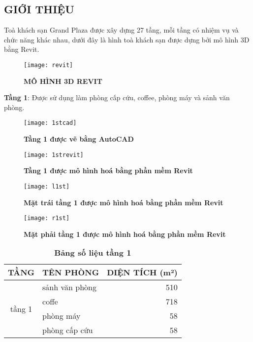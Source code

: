 \subsection{GIỚI THIỆU}
Toà khách sạn Grand Plaza được xây dựng 27 tầng, mỗi tầng có nhiệm vụ và chức năng khác nhau, dưới đây là hình toà khách sạn được dựng bởi mô hình 3D bằng Revit.

\begin{figure}[H]
	\centering
	\texttt{[image: revit]}
	\caption{\textbf{MÔ HÌNH 3D REVIT}}
	\label{revit}
\end{figure}

\newpage
\textbf{Tầng 1}: Được sử dụng làm phòng cấp cứu, coffee, phòng máy và sảnh văn phòng.

\begin{figure}[H]
	\centering
	\texttt{[image: 1stcad]}
    \caption{\textbf{Tầng 1 được vẽ bằng AutoCAD}}
	\label{1stcad}
\end{figure}

\begin{figure}[H]
	\centering
	\texttt{[image: 1strevit]}
	\caption{\textbf{Tầng 1 được mô hình hoá bằng phần mềm Revit}}
	\label{1strevit}
\end{figure}

\begin{figure}[H]
	\centering
	\texttt{[image: l1st]}
	\caption{\textbf{Mặt trái tầng 1 được mô hình hoá bằng phần mềm Revit}}
	\label{l1st}
\end{figure}

\begin{figure}[H]
	\centering
	\texttt{[image: r1st]}
	\caption{\textbf{Mặt phải tầng 1 được mô hình hoá bằng phần mềm Revit}}
	\label{r1st}
\end{figure}

\begin{table}[H]
	\centering
	\caption{\textbf{Bảng số liệu tầng 1}}
\begin{tabular}{|c|l|r|}
	\hline
	TẦNG & TÊN PHÒNG & \multicolumn{1}{l|}{DIỆN TÍCH (m²) } \bigstrut\\
	\hline
	\multirow{4}[8]{*}{tầng 1} & sảnh văn phòng & 510 \bigstrut\\
	\cline{2-3}      & coffe & 718 \bigstrut\\
	\cline{2-3}      & phòng máy & 58 \bigstrut\\
	\cline{2-3}      & phòng cấp cứu & 58 \bigstrut\\
	\hline
\end{tabular}%
    \label{tab:bảng số liệu tầng 1}
\end{table}

